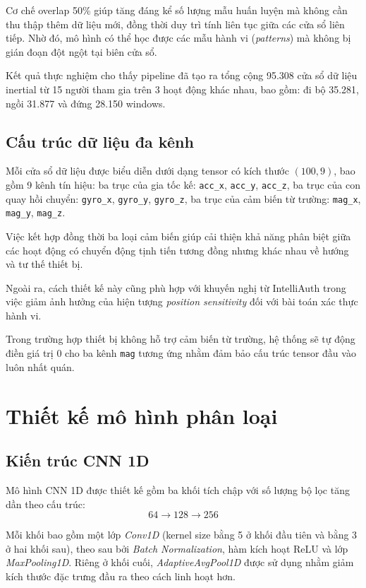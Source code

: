 \documentclass[../DoAn.tex]{subfiles}
\begin{document}
    Cơ chế overlap 50\% giúp tăng đáng kể số lượng mẫu huấn luyện mà không cần thu thập thêm dữ liệu mới, đồng thời duy trì tính liên tục giữa các cửa sổ liên tiếp. Nhờ đó, mô hình có thể học được các mẫu hành vi (\textit{patterns}) mà không bị gián đoạn đột ngột tại biên cửa sổ.
    
    Kết quả thực nghiệm cho thấy pipeline đã tạo ra tổng cộng 95.308 cửa sổ dữ liệu inertial từ 15 người tham gia trên 3 hoạt động khác nhau, bao gồm: đi bộ 35.281, ngồi 31.877 và đứng 28.150 windows.

    \subsection{Cấu trúc dữ liệu đa kênh}

    Mỗi cửa sổ dữ liệu được biểu diễn dưới dạng tensor có kích thước $(100, 9)$, bao gồm 9 kênh tín hiệu: ba trục của gia tốc kế: \texttt{acc\_x}, \texttt{acc\_y}, \texttt{acc\_z}, ba trục của con quay hồi chuyển: \texttt{gyro\_x}, \texttt{gyro\_y}, \texttt{gyro\_z}, ba trục của cảm biến từ trường: \texttt{mag\_x}, \texttt{mag\_y}, \texttt{mag\_z}.
    
    Việc kết hợp đồng thời ba loại cảm biến giúp cải thiện khả năng phân biệt giữa các hoạt động có chuyển động tịnh tiến tương đồng nhưng khác nhau về hướng và tư thế thiết bị.
    
    Ngoài ra, cách thiết kế này cũng phù hợp với khuyến nghị từ IntelliAuth trong việc giảm ảnh hưởng của hiện tượng \textit{position sensitivity} đối với bài toán xác thực hành vi.
    
    Trong trường hợp thiết bị không hỗ trợ cảm biến từ trường, hệ thống sẽ tự động điền giá trị $0$ cho ba kênh \texttt{mag} tương ứng nhằm đảm bảo cấu trúc tensor đầu vào luôn nhất quán.

    \section{Thiết kế mô hình phân loại}

    \subsection{Kiến trúc CNN 1D}

    Mô hình CNN 1D được thiết kế gồm ba khối tích chập với số lượng bộ lọc tăng dần theo cấu trúc:
    \[
    64 \rightarrow 128 \rightarrow 256
    \]
    
    Mỗi khối bao gồm một lớp \textit{Conv1D} (kernel size bằng 5 ở khối đầu tiên và bằng 3 ở hai khối sau), theo sau bởi \textit{Batch Normalization}, hàm kích hoạt ReLU và lớp \textit{MaxPooling1D}. Riêng ở khối cuối, \textit{AdaptiveAvgPool1D} được sử dụng nhằm giảm kích thước đặc trưng đầu ra theo cách linh hoạt hơn.
    
\end{document}
